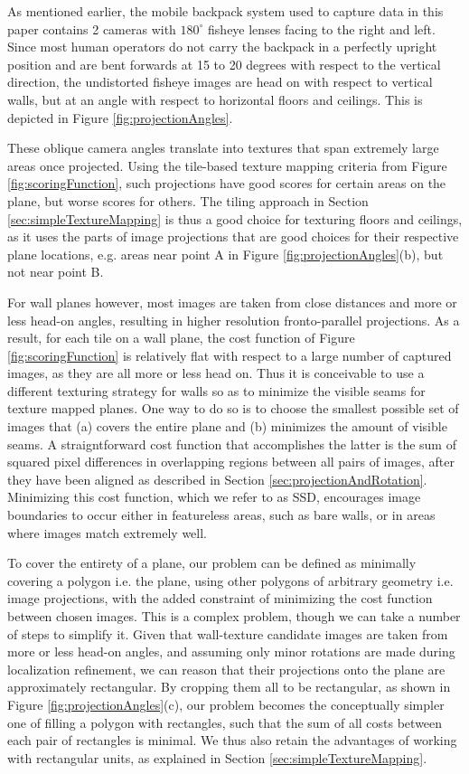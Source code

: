 \documentclass[10pt,twocolumn,letterpaper]{article}
\begin{document}
As mentioned earlier, the mobile backpack system used to capture data
in this paper contains 2 cameras with $180^\circ$ fisheye lenses
facing to the right and left. Since most human operators do not carry
the backpack in a perfectly upright position and are bent forwards at
15 to 20 degrees with respect to the vertical direction, the
undistorted fisheye images are head on with respect to vertical walls,
but at an angle with respect to horizontal floors and ceilings. This
is depicted in Figure \ref{fig:projectionAngles}.


These oblique camera angles translate into textures that span
extremely large areas once projected. Using the tile-based texture
mapping criteria from Figure \ref{fig:scoringFunction}, such
projections have good scores for certain areas on the plane, but worse
scores for others. The tiling approach in Section
\ref{sec:simpleTextureMapping} is thus a good choice for texturing
floors and ceilings, as it uses the parts of image projections that
are good choices for their respective plane locations, e.g. areas near
point A in Figure \ref{fig:projectionAngles}(b), but not near point B.

For wall planes however, most images are taken from close distances
and more or less head-on angles, resulting in higher resolution
fronto-parallel projections. As a result, for each tile on a wall
plane, the cost function of Figure \ref{fig:scoringFunction} is
relatively flat with respect to a large number of captured images, as
they are all more or less head on. Thus it is conceivable to use a
different texturing strategy for walls so as to minimize the visible
seams for texture mapped planes. One way to do so is to choose the
smallest possible set of images that (a) covers the entire plane and
(b) minimizes the amount of visible seams. A straigntforward cost
function that accomplishes the latter is the sum of squared pixel
differences in overlapping regions between all pairs of images, after
they have been aligned as described in Section
\ref{sec:projectionAndRotation}. Minimizing this cost function, which
we refer to as SSD, encourages image boundaries to occur either in
featureless areas, such as bare walls, or in areas where images match
extremely well.

To cover the entirety of a plane, our problem can be defined as
minimally covering a polygon i.e. the plane, using other polygons of
arbitrary geometry i.e. image projections, with the added constraint
of minimizing the cost function between chosen images.  This is a
complex problem, though we can take a number of steps to simplify
it. Given that wall-texture candidate images are taken from more or
less head-on angles, and assuming only minor rotations are made during
localization refinement, we can reason that their projections onto the
plane are approximately rectangular. By cropping them all to be
rectangular, as shown in Figure \ref{fig:projectionAngles}(c), our
problem becomes the conceptually simpler one of filling a polygon with
rectangles, such that the sum of all costs between each pair of
rectangles is minimal. We thus also retain the advantages of working
with rectangular units, as explained in Section
\ref{sec:simpleTextureMapping}.
\end{document}
